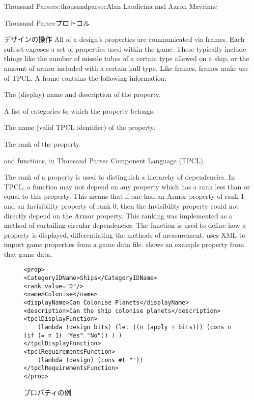 \begin{aosachapter}{Thousand Parsec}{s:thousandparsec}{Alan Laudicina and Aaron Mavrinac}
\begin{aosasect1}{Thousand Parsecプロトコル}
\begin{aosasect2}{デザインの操作}
All of a design's properties are communicated via 
frames. Each ruleset exposes a set of properties used within the
game. These typically include things like the number of missile tubes
of a certain type allowed on a ship, or the amount of armor included
with a certain hull type. Like  frames,
 frames make use of TPCL\@. A  frame
contains the following information:

\begin{aosaitemize}

  \item The (display) name and description of the property.

  \item A list of categories to which the property belongs.

  \item The name (valid TPCL identifier) of the property.

  \item The rank of the property.

  \item {} and  functions, in Thousand Parsec Component Language (TPCL).

\end{aosaitemize}

The rank of a property is used to distinguish a hierarchy of
dependencies. In TPCL, a function may not depend on any property which
has a rank less than or equal to this property. This means that if one
had an Armor property of rank 1 and an Invisibility property of rank
0, then the Invisibility property could not directly depend on the
Armor property. This ranking was implemented as a method of curtailing
circular dependencies. The  function is used to define
how a property is displayed, differentiating the methods of
measurement.  uses XML to import game
properties from a game data file.  shows an
example property from that game data.

\begin{figure}
\begin{verbatim}
<prop>
<CategoryIDName>Ships</CategoryIDName>
<rank value="0"/>
<name>Colonise</name>
<displayName>Can Colonise Planets</displayName>
<description>Can the ship colonise planets</description>
<tpclDisplayFunction>
    (lambda (design bits) (let ((n (apply + bits))) (cons n (if (= n 1) "Yes" "No")) ) )
</tpclDisplayFunction>
<tpclRequirementsFunction>
    (lambda (design) (cons #t ""))
</tpclRequirementsFunction>
</prop>
\end{verbatim}
\caption{プロパティの例}
\label{fig.tp.prop}
\end{figure}


\end{aosasect2}
\end{aosasect1}
\end{aosachapter}
